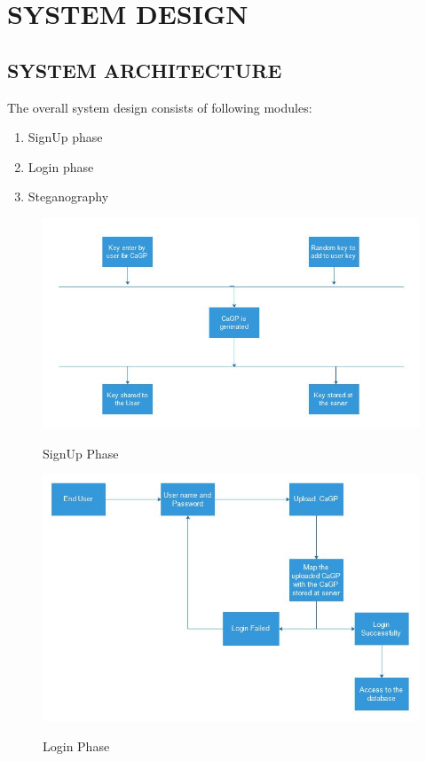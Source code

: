 \documentclass[12pt]{extreport}
\begin{document}

\chapter{SYSTEM DESIGN}

\section{SYSTEM ARCHITECTURE}
The overall system design consists of following modules:
\begin{enumerate}
\item SignUp phase
\item Login phase
\item Steganography
\end{enumerate}

\begin{figure}[H]


	\includegraphics[scale=0.75]{1p.JPG}\\
	\caption{SignUp Phase}
	
	\end{figure}
	
	

\begin{figure}[H]


	\includegraphics[scale=0.75]{2p.JPG}\\
	\caption{Login Phase}
	
	\end{figure}
	
\end{document}
